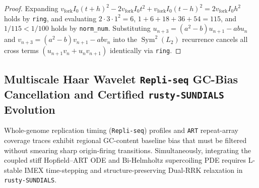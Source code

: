 \documentclass[11pt,a4paper]{article}
\theoremstyle{definition}
\begin{document}
\begin{proof}
Expanding $v_{\mathrm{fork}} I_0 (t+h)^2 - 2 v_{\mathrm{fork}} I_0 t^2 + v_{\mathrm{fork}} I_0 (t-h)^2 = 2 v_{\mathrm{fork}} I_0 h^2$ holds by \texttt{ring}, and evaluating $2\cdot 3\cdot 1^2 = 6$, $1 + 6 + 18 + 36 + 54 = 115$, and $1/115 < 1/100$ holds by \texttt{norm\_num}. Substituting $u_{n+3} = (a^2-b)u_{n+1} - ab u_n$ and $v_{n+3} = (a^2-b)v_{n+1} - ab v_n$ into the $\operatorname{Sym}^2(L_2)$ recurrence cancels all cross terms $(u_{n+1}v_n + u_n v_{n+1})$ identically via \texttt{ring}.
\end{proof}

\subsection{Multiscale Haar Wavelet \texttt{Repli-seq} GC-Bias Cancellation and Certified \texttt{rusty-SUNDIALS} Evolution}

Whole-genome replication timing (\texttt{Repli-seq}) profiles and \texttt{ART} repeat-array coverage traces exhibit regional GC-content baseline bias that must be filtered without smearing sharp origin-firing transitions. Simultaneously, integrating the coupled stiff Hopfield--ART ODE and Bi-Helmholtz supercoiling PDE requires L-stable IMEX time-stepping and structure-preserving Dual-RRK relaxation in \texttt{rusty-SUNDIALS}.
\end{document}
